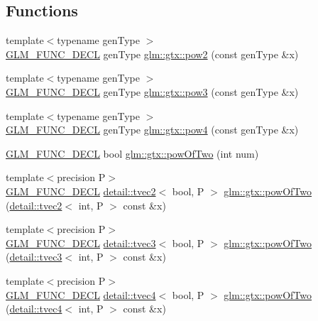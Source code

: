 \subsection*{Functions}
\begin{DoxyCompactItemize}
\item 
{\footnotesize template$<$typename gen\+Type $>$ }\\\hyperlink{setup_8hpp_ab2d052de21a70539923e9bcbf6e83a51}{G\+L\+M\+\_\+\+F\+U\+N\+C\+\_\+\+D\+E\+CL} gen\+Type \hyperlink{group__gtx__optimum__pow_gad18baedb0f3eaea4b4544771e19574f5}{glm\+::gtx\+::pow2} (const gen\+Type \&x)
\item 
{\footnotesize template$<$typename gen\+Type $>$ }\\\hyperlink{setup_8hpp_ab2d052de21a70539923e9bcbf6e83a51}{G\+L\+M\+\_\+\+F\+U\+N\+C\+\_\+\+D\+E\+CL} gen\+Type \hyperlink{group__gtx__optimum__pow_ga47dbbd973d7ad8be1b135d57281e16cf}{glm\+::gtx\+::pow3} (const gen\+Type \&x)
\item 
{\footnotesize template$<$typename gen\+Type $>$ }\\\hyperlink{setup_8hpp_ab2d052de21a70539923e9bcbf6e83a51}{G\+L\+M\+\_\+\+F\+U\+N\+C\+\_\+\+D\+E\+CL} gen\+Type \hyperlink{group__gtx__optimum__pow_gabae007bac8e442a2601db03de5827107}{glm\+::gtx\+::pow4} (const gen\+Type \&x)
\item 
\hyperlink{setup_8hpp_ab2d052de21a70539923e9bcbf6e83a51}{G\+L\+M\+\_\+\+F\+U\+N\+C\+\_\+\+D\+E\+CL} bool \hyperlink{group__gtx__optimum__pow_ga399b24df28267c1f061c462dd359affd}{glm\+::gtx\+::pow\+Of\+Two} (int num)
\item 
{\footnotesize template$<$precision P$>$ }\\\hyperlink{setup_8hpp_ab2d052de21a70539923e9bcbf6e83a51}{G\+L\+M\+\_\+\+F\+U\+N\+C\+\_\+\+D\+E\+CL} \hyperlink{structglm_1_1detail_1_1tvec2}{detail\+::tvec2}$<$ bool, P $>$ \hyperlink{group__gtx__optimum__pow_ga2dff80972edb8f4be69e40bb27ed0a9b}{glm\+::gtx\+::pow\+Of\+Two} (\hyperlink{structglm_1_1detail_1_1tvec2}{detail\+::tvec2}$<$ int, P $>$ const \&x)
\item 
{\footnotesize template$<$precision P$>$ }\\\hyperlink{setup_8hpp_ab2d052de21a70539923e9bcbf6e83a51}{G\+L\+M\+\_\+\+F\+U\+N\+C\+\_\+\+D\+E\+CL} \hyperlink{structglm_1_1detail_1_1tvec3}{detail\+::tvec3}$<$ bool, P $>$ \hyperlink{group__gtx__optimum__pow_ga103cbf6e3d63ab4c2bb5449e19b8639d}{glm\+::gtx\+::pow\+Of\+Two} (\hyperlink{structglm_1_1detail_1_1tvec3}{detail\+::tvec3}$<$ int, P $>$ const \&x)
\item 
{\footnotesize template$<$precision P$>$ }\\\hyperlink{setup_8hpp_ab2d052de21a70539923e9bcbf6e83a51}{G\+L\+M\+\_\+\+F\+U\+N\+C\+\_\+\+D\+E\+CL} \hyperlink{structglm_1_1detail_1_1tvec4}{detail\+::tvec4}$<$ bool, P $>$ \hyperlink{group__gtx__optimum__pow_ga3471bc7e9e580f6b76647cb5156135cc}{glm\+::gtx\+::pow\+Of\+Two} (\hyperlink{structglm_1_1detail_1_1tvec4}{detail\+::tvec4}$<$ int, P $>$ const \&x)
\end{DoxyCompactItemize}


